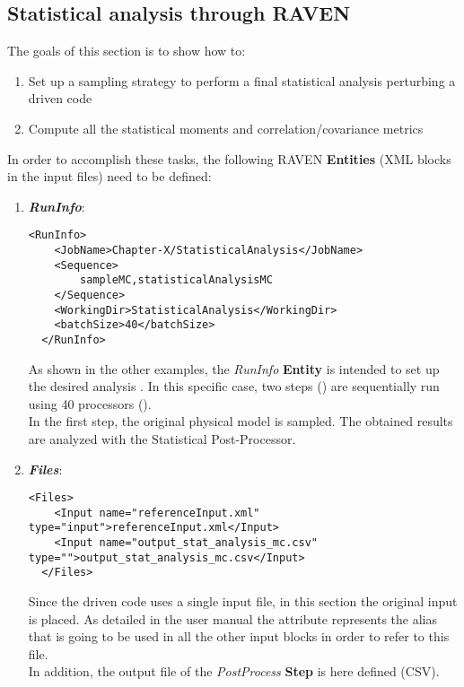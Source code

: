 \subsection{Statistical analysis through RAVEN}
\label{subsub:SAraven}
The goals of this section is to show how to:
 \begin{enumerate}
   \item Set up a sampling strategy to perform a final statistical analysis 
   perturbing a driven code
   \item Compute all the statistical moments and correlation/covariance 
   metrics
\end{enumerate}  
In order to accomplish these tasks, the following RAVEN \textbf{Entities} (XML blocks in the input files) need to be defined:
\begin{enumerate}
   \item \textbf{\textit{RunInfo}}:
\begin{lstlisting}[style=XML,morekeywords={arg,extension,pauseAtEnd,overwrite}]
  <RunInfo>
    <JobName>Chapter-X/StatisticalAnalysis</JobName>
    <Sequence>
        sampleMC,statisticalAnalysisMC
    </Sequence>
    <WorkingDir>StatisticalAnalysis</WorkingDir>
    <batchSize>40</batchSize>
  </RunInfo>
\end{lstlisting}
   As shown in the other examples, the \textit{RunInfo} \textbf{Entity} is intended  to set up the desired analysis . In this specific case, two steps  () are  sequentially run 
   using 40 processors (). 
   \\In the first step, the original physical model is sampled. The obtained results are  analyzed with the Statistical Post-Processor. 
   \item \textbf{\textit{Files}}:
\begin{lstlisting}[style=XML,morekeywords={arg,extension,pauseAtEnd,overwrite}]
  <Files>
    <Input name="referenceInput.xml" type="input">referenceInput.xml</Input>
    <Input name="output_stat_analysis_mc.csv" type="">output_stat_analysis_mc.csv</Input>
  </Files>
\end{lstlisting}
   Since the driven code uses a single input file, in this section the original input is placed. As detailed in the user manual
   the attribute   represents the alias that is going to be 
   used in all the other input blocks in order to refer to this file. 
   \\In addition, the output file of the \textit{PostProcess} \textbf{Step} is
   here defined (CSV).

\end{enumerate}
